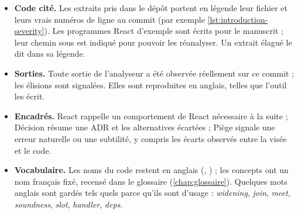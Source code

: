 \begin{itemize}
  \item \textbf{Code cité.} Les extraits pris dans le dépôt portent en légende
    leur fichier et leurs vrais numéros de ligne au commit
    \snapshotCommit{} (par exemple \cref{lst:introduction-severity}). Les
    programmes React d'exemple sont écrits pour le manuscrit ; leur chemin
    sous  est indiqué pour pouvoir les réanalyser. Un extrait
    élagué le dit dans sa légende.
  \item \textbf{Sorties.} Toute sortie de l'analyseur a été observée
    réellement sur ce commit ; les élisions sont signalées. Elles sont
    reproduites en anglais, telles que l'outil les écrit.
  \item \textbf{Encadrés.} \og React\fg{} rappelle un comportement de React
    nécessaire à la suite ; \og Décision\fg{} résume une ADR et les
    alternatives écartées ; \og Piège\fg{} signale une erreur naturelle ou une
    subtilité, y compris les écarts observés entre la visée et le code.
  \item \textbf{Vocabulaire.} Les noms du code restent en anglais
    (, ) ; les concepts ont un nom
    français fixé, recensé dans le glossaire (\cref{chap:glossaire}). Quelques
    mots anglais sont gardés tels quels parce qu'ils sont d'usage :
    \emph{widening}, \emph{join}, \emph{meet}, \emph{soundness}, \emph{slot},
    \emph{handler}, \emph{deps}.
\end{itemize}

